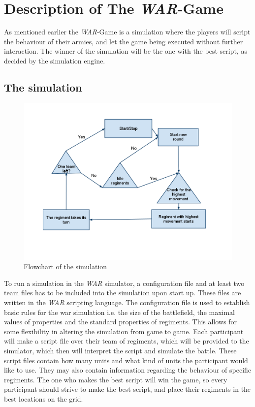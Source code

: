 \section{Description of The \textit{WAR}-Game}\label{sec:describeWAR}
As mentioned earlier the \textit{WAR}-Game is a simulation where the players will script the behaviour of their armies, and let the game being executed without further interaction. The winner of the simulation will be the one with the best script, as decided by the simulation engine.
	\subsection{The simulation}
	\begin{figure}
	\centering
	\includegraphics[scale=0.4]{rapport/2/figures/FlowChartSimulation}
	\caption{ Flowchart of the simulation } \label{fig:FlowChartSimulation}
	\end{figure}		
		To run a simulation in the \textit{WAR} simulator, a configuration file and at least two team files has to be included into the simulation upon start up. These files are written in the \textit{WAR} scripting language.
		The configuration file is used to establish basic rules for the war simulation i.e. the size of the battlefield, the maximal values of properties and the standard properties of regiments.
		This allows for some flexibility in altering the simulation from game to game.
		Each participant will make a script file over their team of regiments, which will be provided to the simulator, 	which then will interpret the script and simulate the battle. These script files contain how many units and what kind of units the participant would like to use.	They may also contain information regarding the behaviour of specific regiments. The one who makes the best script will win the game, so every participant should strive to make the best script, and place their regiments in the best locations on the grid.
